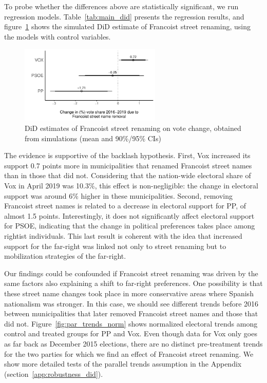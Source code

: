 \documentclass[12pt, titlepage]{article}
\begin{document}


To probe whether the differences above are statistically significant, we run regression models. Table~\ref{tab:main_did} presents the regression results, and figure~\ref{fig:main_did} shows the simulated DiD estimate of Francoist street renaming, using the models with control variables.



\begin{figure}[htb!]
\centering

    \vspace{25pt}

  \includegraphics[width = 0.6\textwidth]{img/DiD_estimates}

  \caption{DiD estimates of Francoist street renaming on vote change, obtained from simulations (mean and 90\%/95\% CIs)}\label{fig:main_did}

\end{figure}

The evidence is supportive of the backlash hypothesis. First, Vox increased its support 0.7 points more in municipalities that renamed Francoist street names than in those that did not. Considering that the nation-wide electoral share of Vox in April 2019 was 10.3\%, this effect is non-negligible: the change in electoral support was around 6\% higher in these municipalities.
Second, removing Francoist street names is related to a decrease in electoral support for PP, of almost 1.5 points. Interestingly, it does not significantly affect electoral support for PSOE, indicating that the change in political preferences takes place among rightist individuals. This last result is coherent with the idea that increased support for the far-right was linked not only to street renaming but to mobilization strategies of the far-right.

Our findings could be confounded if Francoist street renaming was driven by the same factors also explaining a shift to far-right preferences.
One possibility is that these street name changes took place in more conservative areas where Spanish nationalism was stronger.
In this case, we should see different trends before 2016 between municipalities that later removed Francoist street names and those that did not.
Figure~\ref{fig:par_trends_norm} shows normalized electoral trends among control and treated groups for PP and Vox.
Even though data for Vox only goes as far back as December 2015 elections, there are no distinct pre-treatment trends for the two parties for which we find an effect of Francoist street renaming.
We show more detailed tests of the parallel trends assumption in the Appendix (section~\ref{app:robustness_did}).
\end{document}
